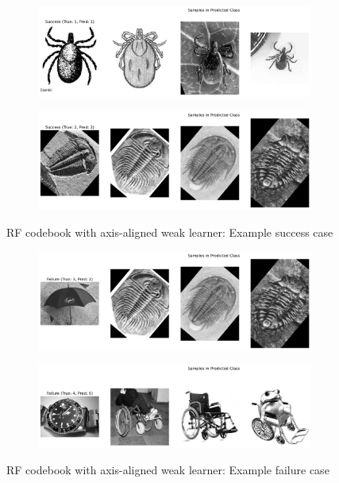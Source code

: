 \begin{figure}[htbp]
	\centering
	\begin{subfigure}{0.45\linewidth}
		\centering
		\includegraphics[width=\linewidth]{image/conf-appendix/rf_axis_succ1.png}
	\end{subfigure}%
	\quad
	\begin{subfigure}{0.45\linewidth}
		\centering
		\includegraphics[width=\linewidth]{image/conf-appendix/rf_axis_succ2.png}
	\end{subfigure}
	\caption{RF codebook with axis-aligned weak learner: Example success case}
	\label{fig:APP-q3-case1}
\end{figure}
\begin{figure}[htbp]
	\centering
	\begin{subfigure}[t]{0.45\linewidth}
		\centering
		\includegraphics[width=\linewidth]{image/conf-appendix/rf_axis_fail2.png}
	\end{subfigure}%
	\quad
	\begin{subfigure}[t]{0.45\linewidth}
		\centering
		\includegraphics[width=\linewidth]{image/conf-appendix/rf_axis_fail3.png}
	\end{subfigure}
	\caption{RF codebook with axis-aligned weak learner: Example failure case}
	\label{fig:APP-q3-case2}
\end{figure}

